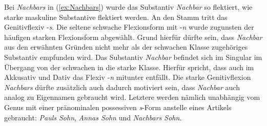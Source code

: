 Bei \textit{Nachbars} in (\ref{ex:Nachbars}) wurde das Substantiv \textit{Nachbar} so flektiert, wie starke maskuline Substantive flektiert werden. An den Stamm tritt das Genitivflexiv -\textit{s}. Die seltene schwache Flexionsform mit -\textit{n} wurde zugunsten der häufigen starken Flexionsform abgewählt. Grund hierfür dürfte sein, dass \textit{Nachbar} aus den erwähnten Gründen nicht mehr als der schwachen Klasse zugehöriges Substantiv empfunden wird. Das Substantiv \textit{Nachbar} befindet sich im Singular im Übergang von der schwachen in die starke Klasse. Hierfür spricht, dass auch im Akkusativ und Dativ das Flexiv -\textit{n} mitunter entfällt. Die starke Genitivflexion \textit{Nachbars} dürfte zusätzlich auch dadurch motiviert sein, dass \textit{Nachbar} auch analog zu Eigennamen gebraucht wird. Letztere werden nämlich unabhängig vom Genus mit einer pränominalen possessiven \textit{s}-Form anstelle eines Artikels gebraucht: \textit{Pauls Sohn}, \textit{Annas Sohn} und \textit{Nachbars Sohn}.   


